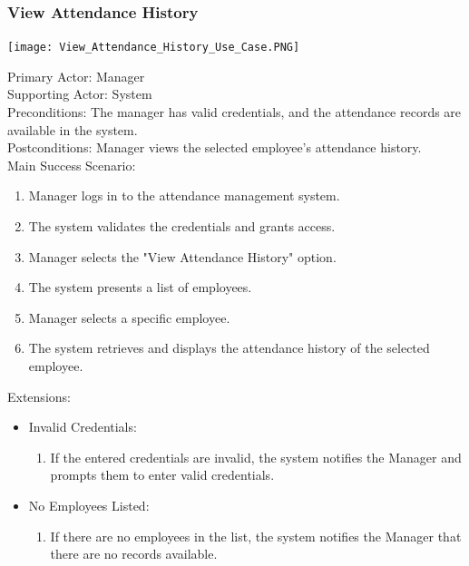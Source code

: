 \documentclass[a4paper, 12pt]{article}
\begin{document}
\subsubsection{View Attendance History}
\begin{center}
\texttt{[image: View\_Attendance\_History\_Use\_Case.PNG]}\par
\end{center}
Primary Actor: Manager\\
Supporting Actor: System\\
Preconditions: The manager has valid credentials, and the attendance records are available in the system.\\
Postconditions: Manager views the selected employee's attendance history.\\
\newpage
Main Success Scenario:
\begin{enumerate}
    \item Manager logs in to the attendance management system.
    \item The system validates the credentials and grants access.
    \item Manager selects the "View Attendance History" option.
    \item The system presents a list of employees.
    \item Manager selects a specific employee.
    \item The system retrieves and displays the attendance history of the selected employee.
\end{enumerate}
Extensions:
\begin{itemize}
    \item Invalid Credentials:
    \begin{enumerate}
        \item If the entered credentials are invalid, the system notifies the Manager and prompts them to enter valid credentials.
    \end{enumerate}
    \item No Employees Listed:
    \begin{enumerate}
        \item If there are no employees in the list, the system notifies the Manager that there are no records available.
    \end{enumerate}
\end{itemize}
\end{document}
